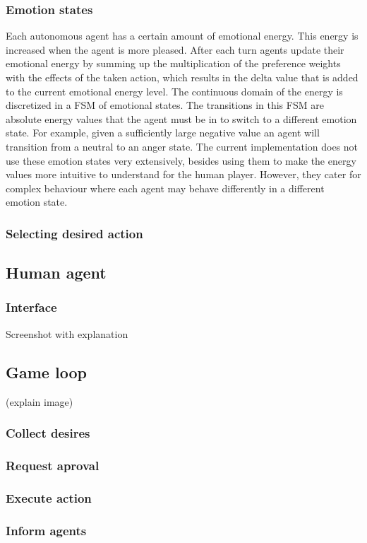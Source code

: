 \documentclass[11pt,a4paper]{article}
\begin{document}
    \subsubsection{Emotion states}
      Each autonomous agent has a certain amount of emotional energy. This energy is increased when the agent is more pleased. After each turn agents update their emotional energy by summing up the multiplication of the preference weights with the effects of the taken action, which results in the delta value that is added to the current emotional energy level. The continuous domain of the energy is discretized in a FSM of emotional states. The transitions in this FSM are absolute energy values that the agent must be in to switch to a different emotion state. For example, given a sufficiently large negative value an agent will transition from a neutral to an anger state. The current implementation does not use these emotion states very extensively, besides using them to make the energy values more intuitive to understand for the human player. However, they cater for complex behaviour where each agent may behave differently in a different emotion state.
    \subsubsection{Selecting desired action}
  \subsection{Human agent}
    \subsubsection{Interface}
    Screenshot with explanation
  \subsection{Game loop} 
  (explain image)
    \subsubsection{Collect desires}
    \subsubsection{Request aproval}
    \subsubsection{Execute action}
    \subsubsection{Inform agents}
\end{document}
